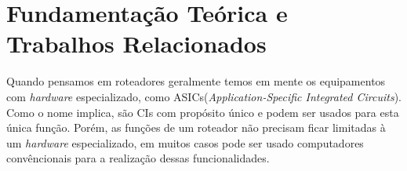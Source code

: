 
\section{Fundamentação Teórica e Trabalhos Relacionados}
Quando pensamos em roteadores geralmente temos em mente os equipamentos com \textit{hardware} especializado, como ASICs(\textit{Application-Specific Integrated Circuits}). Como o nome implica, são CIs com propósito único e podem ser usados para esta única função. Porém, as funções de um roteador não precisam ficar limitadas à um \textit{hardware} especializado, em muitos casos pode ser usado computadores convêncionais para a realização dessas funcionalidades.


